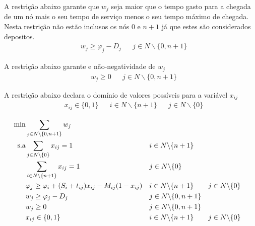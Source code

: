 \documentclass[12pt]{article}
\begin{document}
    A restrição abaixo garante que $w_j$ seja maior que o tempo gasto para a chegada de um nó mais o seu tempo de serviço menos o seu tempo máximo de chegada. Nesta restrição não estão inclusos os nós $0$ e $n+1$ já que estes são considerados depositos.
    \begin{align}
      & w_j \geq \varphi_j - D_j                                           & \label{eq4}    & j\in N\backslash \{0,n+1\}    
    \end{align}
    
      A restrição abaixo garante e não-negatividade de $w_j$
    \begin{align}
      & w_j \geq 0                                                         & \label{eq5}    & j\in N\backslash \{0,n+1\}        
    \end{align}
    
    A restrição abaixo declara o domínio de valores possíveis para a variável $x_{ij}$
    \begin{align}
      & x_{ij} \in \{0,1\}                                                 & \label{eq6}    & i\in N\backslash \{n+1\}   &  & j\in N\backslash \{0\}       
    \end{align}
    
    \begin{align}
      \min       & \sum_{_j\in N\backslash \{0,n+1\}} w_j                             &                                                           \\
      \hbox{s.a} & \sum_{j\in N\backslash \{0\}} x_{ij} = 1                           &               & i\in N\backslash \{n+1\}                               \\
                 & \sum_{i\in N\backslash \{n+1\}} x_{ij} = 1                         &    & j\in N\backslash \{0\}                                 \\
                 & \varphi_j \geq \varphi_i + (S_i + t_{ij})x_{ij} - M_{ij}(1-x_{ij}) & \label{eq3}    & i\in N\backslash \{n+1\}   &  & j\in N\backslash \{0\} \\
                 & w_j \geq \varphi_j - D_j                                           & \label{eq4}    & j\in N\backslash \{0,n+1\}                             \\
                 & w_j \geq 0                                                         & \label{eq5}    & j\in N\backslash \{0,n+1\}                             \\
                 & x_{ij} \in \{0,1\}                                                 & \label{eq6}    & i\in N\backslash \{n+1\}   &  & j\in N\backslash \{0\}
    \end{align}
    
\end{document}

